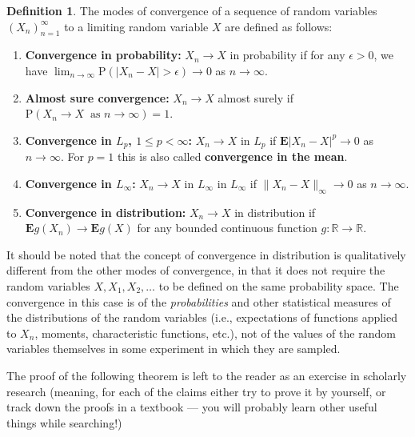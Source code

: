 \documentclass[11pt]{report}
\newcommand{\R}{\mathbb{R}}
\theoremstyle{plain}
\theoremstyle{definition}
\newtheorem{defn}[thm]{Definition}
\begin{document}
\begin{defn}
The modes of convergence of a sequence of random variables $(X_n)_{n=1}^\infty$ to a limiting random variable $X$ are defined as follows:

\begin{enumerate}[label=\arabic*.]
\item \textbf{Convergence in probability:} $X_n \to X$ in probability if for any $\epsilon>0$, we have $\lim_{n\to\infty} \mathrm{P}(|X_n-X|>\epsilon)\to 0$ as $n\to\infty$.
\item \textbf{Almost sure convergence:} $X_n\to X$ almost surely if $\mathrm{P}(X_n\to X\ \textrm{ as }n\to\infty) = 1$.
\item \textbf{Convergence in $L_p$, $1\le p<\infty$:} $X_n\to X$ in $L_p$ if $\mathbf{E}|X_n-X|^p \to 0$ as $n\to\infty$. For $p=1$ this is also called \textbf{convergence in the mean}.
\item \textbf{Convergence in $L_\infty$:} $X_n\to X$ in $L_\infty$ in $L_\infty$ if $\lVert X_n-X\rVert_\infty\to 0$ as $n\to\infty$.
\item \textbf{Convergence in distribution:} $X_n\to X$ in distribution if $\mathbf{E} g(X_n)\to \mathbf{E} g(X)$ for any bounded continuous function $g:\R\to\R$.
\end{enumerate}

\end{defn}

It should be noted that the concept of convergence in distribution is qualitatively different from the other modes of convergence, in that it does not require the random variables $X, X_1, X_2, \ldots$ to be defined on the same probability space. The convergence in this case is of the \emph{probabilities} and other statistical measures of the distributions of the random variables (i.e., expectations of functions applied to $X_n$, moments, characteristic functions, etc.), not of the values of the random variables themselves in some experiment in which they are sampled.

The proof of the following theorem is left to the reader as an exercise in scholarly research (meaning, for each of the claims either try to prove it by yourself, or track down the proofs in a textbook --- you will probably learn other useful things while searching!)
\end{document}
